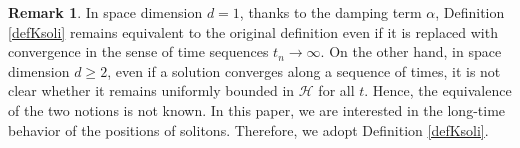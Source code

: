 \documentclass[reqno]{amsart}
\theoremstyle{plain}
\theoremstyle{definition}
\newtheorem{remark}{Remark}[section]
\numberwithin{equation}{section}
\newcommand{\1}{\mathbbm{1}}
\begin{document}
\begin{remark}
In space dimension $d=1$, thanks to the damping term $\alpha$, Definition \ref{defKsoli} remains equivalent to the original definition even if it is replaced with convergence in the sense of time sequences $t_n\to\infty$. On the other hand, in space dimension $d\geq 2$, even if a solution converges along a sequence of times, it is not clear whether it remains uniformly bounded in $\mathcal{H}$ for all $t$. Hence, the equivalence of the two notions is not known. In this paper, we are interested in the long-time behavior of the positions of solitons. Therefore, we adopt Definition \ref{defKsoli}.
\end{remark}




\end{document}
